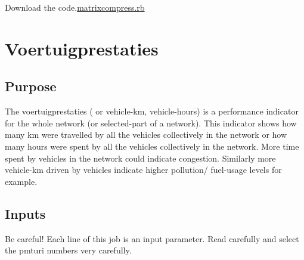 \documentclass[
  letterpaper,
  DIV=11,
  numbers=noendperiod]{scrreprt}
\begin{document}
Download the code.\href{../first.rb}{matrixcompress.rb}

\chapter{Voertuigprestaties}\label{voertuigprestaties}

\section{Purpose}

The voertuigprestaties ( or vehicle-km, vehicle-hours) is a performance
indicator for the whole network (or selected-part of a network). This
indicator shows how many km were travelled by all the vehicles
collectively in the network or how many hours were spent by all the
vehicles collectively in the network. More time spent by vehicles in the
network could indicate congestion. Similarly more vehicle-km driven by
vehicles indicate higher pollution/ fuel-usage levels for example.

\section{Inputs}

\begin{tcolorbox}[enhanced jigsaw, opacitybacktitle=0.6, rightrule=.15mm, left=2mm, title=\textcolor{quarto-callout-important-color}{\faExclamation}\hspace{0.5em}{Important}, bottomrule=.15mm, toptitle=1mm, titlerule=0mm, arc=.35mm, colbacktitle=quarto-callout-important-color!10!white, colframe=quarto-callout-important-color-frame, opacityback=0, bottomtitle=1mm, breakable, toprule=.15mm, leftrule=.75mm, coltitle=black, colback=white]

Be careful! Each line of this job is an input parameter. Read carefully
and select the pmturi numbers very carefully.

\end{tcolorbox}
\end{document}
